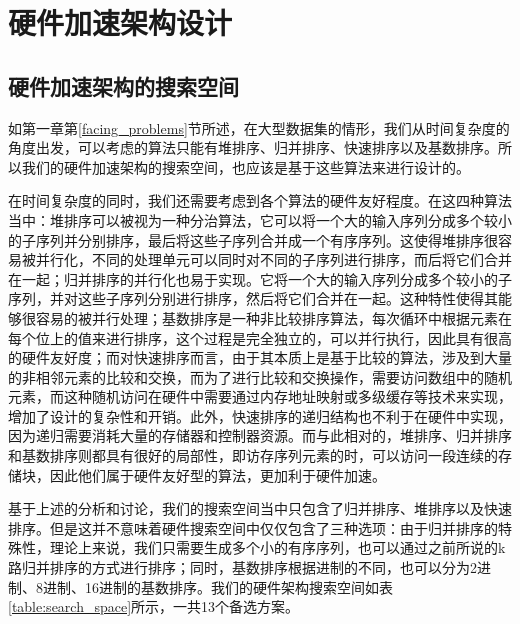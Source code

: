 
\chapter{硬件加速架构设计}
\section{硬件加速架构的搜索空间}\label{sec:search_space_design}
如第一章第\ref{facing_problems}节所述，在大型数据集的情形，我们从时间复杂度的角度出发，可以考虑的算法只能有堆排序、归并排序、快速排序以及基数排序。所以我们的硬件加速架构的搜索空间，也应该是基于这些算法来进行设计的。

在时间复杂度的同时，我们还需要考虑到各个算法的硬件友好程度。在这四种算法当中：堆排序可以被视为一种分治算法，它可以将一个大的输入序列分成多个较小的子序列并分别排序，最后将这些子序列合并成一个有序序列。这使得堆排序很容易被并行化，不同的处理单元可以同时对不同的子序列进行排序，而后将它们合并在一起；归并排序的并行化也易于实现。它将一个大的输入序列分成多个较小的子序列，并对这些子序列分别进行排序，然后将它们合并在一起。这种特性使得其能够很容易的被并行处理；基数排序是一种非比较排序算法，每次循环中根据元素在每个位上的值来进行排序，这个过程是完全独立的，可以并行执行，因此具有很高的硬件友好度；而对快速排序而言，由于其本质上是基于比较的算法，涉及到大量的非相邻元素的比较和交换，而为了进行比较和交换操作，需要访问数组中的随机元素，而这种随机访问在硬件中需要通过内存地址映射或多级缓存等技术来实现，增加了设计的复杂性和开销。此外，快速排序的递归结构也不利于在硬件中实现，因为递归需要消耗大量的存储器和控制器资源。而与此相对的，堆排序、归并排序和基数排序则都具有很好的局部性，即访存序列元素的时，可以访问一段连续的存储块，因此他们属于硬件友好型的算法，更加利于硬件加速。

基于上述的分析和讨论，我们的搜索空间当中只包含了归并排序、堆排序以及快速排序。但是这并不意味着硬件搜索空间中仅仅包含了三种选项：由于归并排序的特殊性，理论上来说，我们只需要生成多个小的有序序列，也可以通过之前所说的k路归并排序的方式进行排序；同时，基数排序根据进制的不同，也可以分为2进制、8进制、16进制的基数排序。我们的硬件架构搜索空间如表\ref{table:search_space}所示，一共13个备选方案。

\begin{table}[htbp]
\centering
\caption{硬件架构搜索空间}
\label{table:search_space}
\end{table}


